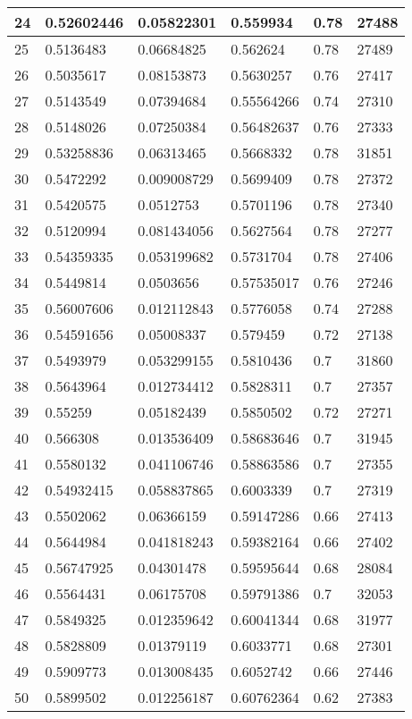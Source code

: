 \begin{longtable}{|l|l|l|l|l|l|}
24 & 0.52602446 & 0.05822301 & 0.559934 & 0.78 & 27488 \\ \hline 
25 & 0.5136483 & 0.06684825 & 0.562624 & 0.78 & 27489 \\ \hline 
26 & 0.5035617 & 0.08153873 & 0.5630257 & 0.76 & 27417 \\ \hline 
27 & 0.5143549 & 0.07394684 & 0.55564266 & 0.74 & 27310 \\ \hline 
28 & 0.5148026 & 0.07250384 & 0.56482637 & 0.76 & 27333 \\ \hline 
29 & 0.53258836 & 0.06313465 & 0.5668332 & 0.78 & 31851 \\ \hline 
30 & 0.5472292 & 0.009008729 & 0.5699409 & 0.78 & 27372 \\ \hline 
31 & 0.5420575 & 0.0512753 & 0.5701196 & 0.78 & 27340 \\ \hline 
32 & 0.5120994 & 0.081434056 & 0.5627564 & 0.78 & 27277 \\ \hline 
33 & 0.54359335 & 0.053199682 & 0.5731704 & 0.78 & 27406 \\ \hline 
34 & 0.5449814 & 0.0503656 & 0.57535017 & 0.76 & 27246 \\ \hline 
35 & 0.56007606 & 0.012112843 & 0.5776058 & 0.74 & 27288 \\ \hline 
36 & 0.54591656 & 0.05008337 & 0.579459 & 0.72 & 27138 \\ \hline 
37 & 0.5493979 & 0.053299155 & 0.5810436 & 0.7 & 31860 \\ \hline 
38 & 0.5643964 & 0.012734412 & 0.5828311 & 0.7 & 27357 \\ \hline 
39 & 0.55259 & 0.05182439 & 0.5850502 & 0.72 & 27271 \\ \hline 
40 & 0.566308 & 0.013536409 & 0.58683646 & 0.7 & 31945 \\ \hline 
41 & 0.5580132 & 0.041106746 & 0.58863586 & 0.7 & 27355 \\ \hline 
42 & 0.54932415 & 0.058837865 & 0.6003339 & 0.7 & 27319 \\ \hline 
43 & 0.5502062 & 0.06366159 & 0.59147286 & 0.66 & 27413 \\ \hline 
44 & 0.5644984 & 0.041818243 & 0.59382164 & 0.66 & 27402 \\ \hline 
45 & 0.56747925 & 0.04301478 & 0.59595644 & 0.68 & 28084 \\ \hline 
46 & 0.5564431 & 0.06175708 & 0.59791386 & 0.7 & 32053 \\ \hline 
47 & 0.5849325 & 0.012359642 & 0.60041344 & 0.68 & 31977 \\ \hline 
48 & 0.5828809 & 0.01379119 & 0.6033771 & 0.68 & 27301 \\ \hline 
49 & 0.5909773 & 0.013008435 & 0.6052742 & 0.66 & 27446 \\ \hline 
50 & 0.5899502 & 0.012256187 & 0.60762364 & 0.62 & 27383 \\ \hline 
\end{longtable}
